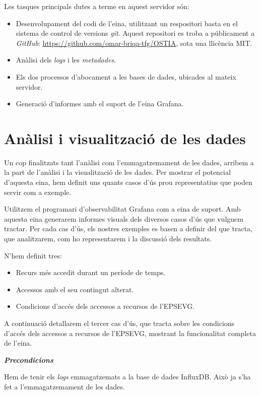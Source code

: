 \documentclass[lettersize,journal]{IEEEtran}
\begin{document}
Les tasques principals dutes a terme en aquest servidor són:
\begin{itemize}
    \item Desenvolupament del codi de l'eina, utilitzant un respositori basta en el sistema de control de versions \textit{git}.
    Aquest repositori es troba a públicament a \textit{GitHub}: \url{https://github.com/omar-briqa-tfg/OSTIA}, sota una llicència MIT.
    \item Anàlisi dels \textit{logs} i les \textit{metadades}.
    \item Els dos processos d'abocament a les bases de dades, ubicades al mateix servidor.
    \item Generació d'informes amb el suport de l'eina Grafana.
\end{itemize}


\section{Anàlisi i visualització de les dades}\label{sec:data-visualization}
Un cop finalitzats tant l'anàlisi com l'emmagatzemament de les dades, arribem a la part de l'anàlisi i la visualització de les dades.
Per mostrar el potencial d'aquesta eina, hem definit uns quants casos d'ús prou representatius que poden servir com a exemple.

Utilitzem el programari d'observabilitat Grafana com a eina de suport.
Amb aquesta eina generarem informes visuals dels diversos casos d'ús que vulguem tractar.
Per cada cas d'ús, els nostres exemples es basen a definir del que tracta, que analitzarem, com ho representarem i la discussió dels resultats.

N'hem definit tres:
\begin{itemize}
    \item Recurs més accedit durant un període de temps.
    \item Accessos amb el seu contingut alterat.
    \item Condicions d'accés dels accessos a recursos de l'EPSEVG.
\end{itemize}

A continuació detallarem el tercer cas d'ús, que tracta sobre les condicions d'accés dels accessos a recursos de l'EPSEVG, mostrant la funcionalitat completa de l'eina.

\textit{\textbf{Precondicions}}

Hem de tenir els \textit{logs} emmagatzemats a la base de dades InfluxDB.
Això ja s'ha fet a l'emmagatzemament de les dades.
\end{document}
